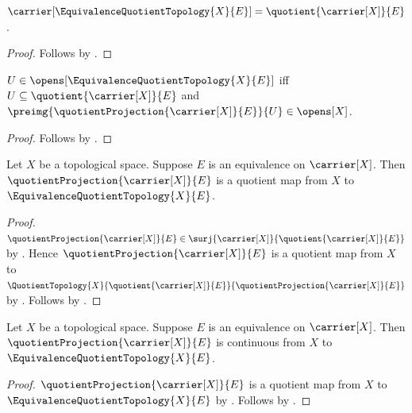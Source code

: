 \begin{proposition}\label{equivalence_quotient_topology_carrier}
    $\carrier[\EquivalenceQuotientTopology{X}{E}]
        =\quotient{\carrier[X]}{E}$.
\end{proposition}
\begin{proof}
    Follows by
        .
\end{proof}

\begin{proposition}\label{equivalence_quotient_topology_open_iff}
    $U\in\opens[\EquivalenceQuotientTopology{X}{E}]$ iff
        $U\subseteq\quotient{\carrier[X]}{E}$ and
        $\preimg{\quotientProjection{\carrier[X]}{E}}{U}
            \in\opens[X]$.
\end{proposition}
\begin{proof}
    Follows by
        .
\end{proof}

\begin{theorem}\label{equivalence_quotient_projection_is_quotient_map}
    Let $X$ be a topological space.
    Suppose $E$ is an equivalence on $\carrier[X]$.
    Then $\quotientProjection{\carrier[X]}{E}$ is a quotient map from
        $X$ to $\EquivalenceQuotientTopology{X}{E}$.
\end{theorem}
\begin{proof}
    $\quotientProjection{\carrier[X]}{E}\in
        \surj{\carrier[X]}{\quotient{\carrier[X]}{E}}$ by
        .
    Hence $\quotientProjection{\carrier[X]}{E}$ is a quotient map from
        $X$ to
        $\QuotientTopology{X}{\quotient{\carrier[X]}{E}}{
            \quotientProjection{\carrier[X]}{E}}$ by
        .
    Follows by .
\end{proof}

\begin{corollary}\label{equivalence_quotient_projection_continuous}
    Let $X$ be a topological space.
    Suppose $E$ is an equivalence on $\carrier[X]$.
    Then $\quotientProjection{\carrier[X]}{E}$ is continuous from $X$
        to $\EquivalenceQuotientTopology{X}{E}$.
\end{corollary}
\begin{proof}
    $\quotientProjection{\carrier[X]}{E}$ is a quotient map from $X$
        to $\EquivalenceQuotientTopology{X}{E}$ by
        .
    Follows by .
\end{proof}

